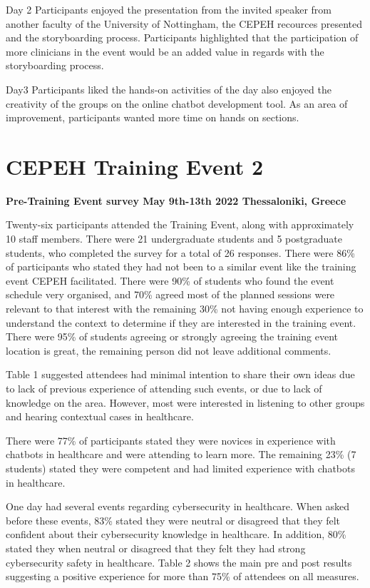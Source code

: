 \documentclass[a4paper, nobind]{templates/ociamthesis}
\begin{document}
Day 2
Participants enjoyed the presentation from the invited speaker from another faculty of the University of Nottingham, the CEPEH recources presented and the storyboarding process. Participants highlighted that the participation of more clinicians in the event would be an added value in regards with the storyboarding process.

Day3
Participants liked the hands-on activities of the day also enjoyed the creativity of the groups on the online chatbot development tool. As an area of improvement, participants wanted more time on hands on sections.

\hypertarget{cepeh-training-event-2}{%
\section{CEPEH Training Event 2}\label{cepeh-training-event-2}}

\textbf{Pre-Training Event survey May 9th-13th 2022 Thessaloniki, Greece}

Twenty-six participants attended the Training Event, along with approximately 10 staff members. There were 21 undergraduate students and 5 postgraduate students, who completed the survey for a total of 26 responses. There were 86\% of participants who stated they had not been to a similar event like the training event CEPEH facilitated. There were 90\% of students who found the event schedule very organised, and 70\% agreed most of the planned sessions were relevant to that interest with the remaining 30\% not having enough experience to understand the context to determine if they are interested in the training event. There were 95\% of students agreeing or strongly agreeing the training event location is great, the remaining person did not leave additional comments.

Table 1 suggested attendees had minimal intention to share their own ideas due to lack of previous experience of attending such events, or due to lack of knowledge on the area. However, most were interested in listening to other groups and hearing contextual cases in healthcare.

There were 77\% of participants stated they were novices in experience with chatbots in healthcare and were attending to learn more. The remaining 23\% (7 students) stated they were competent and had limited experience with chatbots in healthcare.

One day had several events regarding cybersecurity in healthcare. When asked before these events, 83\% stated they were neutral or disagreed that they felt confident about their cybersecurity knowledge in healthcare. In addition, 80\% stated they when neutral or disagreed that they felt they had strong cybersecurity safety in healthcare. Table 2 shows the main pre and post results suggesting a positive experience for more than 75\% of attendees on all measures.
\end{document}
